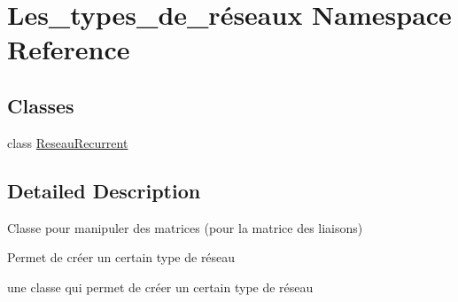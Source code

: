 \hypertarget{namespace_les__types__de__r_xC3_xA9seaux}{}\section{Les\+\_\+types\+\_\+de\+\_\+réseaux Namespace Reference}
\label{namespace_les__types__de__r_xC3_xA9seaux}
\subsection*{Classes}
\begin{DoxyCompactItemize}
\item 
class \hyperlink{class_les__types__de__r_xC3_xA9seaux_1_1_reseau_recurrent}{Reseau\+Recurrent}
\end{DoxyCompactItemize}


\subsection{Detailed Description}
Classe pour manipuler des matrices (pour la matrice des liaisons)

Permet de créer un certain type de réseau

une classe qui permet de créer un certain type de réseau 